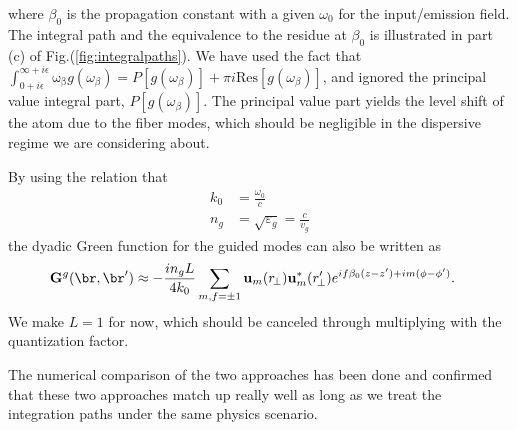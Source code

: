 \documentclass[]{report}
\begin{document}
where $ \beta_0 $ is the propagation constant with a given $ \omega_0 $ for the input/emission field. The integral path and the equivalence to the residue at $ \beta_0 $ is illustrated in part (c) of Fig.(\ref{fig:integralpaths}). We have used the fact that $ \int_{0+i\epsilon}^{\infty+i\epsilon} \mathrm{\omega_\beta}g(\omega_\beta) = P\left[ g(\omega_\beta)\right] +\pi i \mathrm{Res}\left[g(\omega_\beta) \right] $, and ignored the principal value integral part, $ P\left[ g(\omega_\beta)\right] $. The principal value part yields the level shift of the atom due to the fiber modes, which should be negligible in the dispersive regime we are considering about.  

By using the relation that 
\begin{align}
k_0 &=\frac{\omega_0}{c}\\
n_g&=\sqrt{\varepsilon_g}= \frac{c}{v_g}
\end{align}
the dyadic Green function for the guided modes can also be written as
\begin{align}
\mathbf{G}^g(\br,\br') &\approx -\frac{in_gL}{4k_0} \sum_{m,f=\pm 1} \mathbf{u}_{m}(r\!_\perp)\mathbf{u}^*_{m}(r_{\!\perp}^\prime)e^{if\beta_0(z-z')+im(\phi-\phi')}.
\end{align}
We make $ L=1 $ for now, which should be canceled through multiplying with the quantization factor. 
 


The numerical comparison of the two approaches has been done and confirmed that these two approaches match up really well as long as we treat the integration paths under the same physics scenario.  
\end{document}
